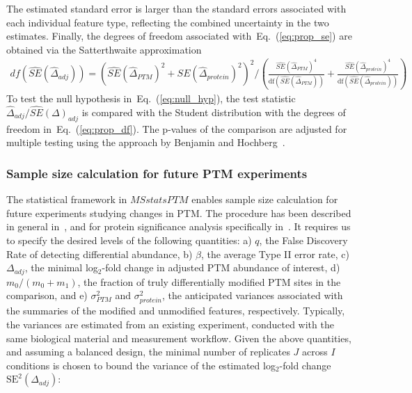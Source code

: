 \documentclass[mcp]{article}
\numberwithin{table}{section}
\def\eqref#1{Eq.~(\ref{eq:#1})}
\begin{document}
The estimated standard error is larger than the standard errors associated with each individual feature type, reflecting the combined uncertainty in the two estimates. 
Finally, the degrees of freedom associated with~\eqref{prop_se} are obtained via the Satterthwaite approximation~\cite{kutner_etal_04a, satterthwaite:1946}
\begin{eqnarray}
df \left(  \widehat{SE}(\hat{\Delta}_{adj}) \right)=  \left( \widehat{SE}(\hat{\Delta}_{PTM})^{2} + \widehat{SE}(\hat{\Delta}_{protein})^{2} \right)^2 \bigg/
\left( \frac{\widehat{SE}(\hat{\Delta}_{PTM})^{4}}{\mathrm{df}(\widehat{SE}(\hat{\Delta}_{PTM}))} + \frac{\widehat{SE}(\hat{\Delta}_{protein})^{4}}{ \mathrm{df}(\widehat{SE}(\hat{\Delta}_{protein}))} \right)
\label{eq:prop_df}
\end{eqnarray}
To test the null hypothesis in~\eqref{null_hyp}, the test statistic $\hat{\Delta}_{adj}/\widehat{SE}(\Delta)_{adj}$ is compared with the Student distribution with the degrees of freedom in~\eqref{prop_df}. The p-values of the comparison are adjusted for multiple testing using the approach by Benjamin and Hochberg~\cite{Benjamini:1995}.

\subsubsection*{Sample size calculation for future PTM experiments}
\label{sec:design}

The statistical framework in $MSstatsPTM$ enables sample size calculation for future experiments studying changes in PTM. 
The procedure has been described in general in~\cite{kutner_etal_04a}, and for protein significance analysis specifically in~\cite{oberg_vitek_09a}. 
It requires us to specify the desired levels of the following quantities: a) $q$, the False Discovery Rate of detecting differential abundance, b) $\beta$, the average Type II error rate, c) $\Delta_{adj}$, the minimal log$_2$-fold change in adjusted PTM abundance  of interest, d) $m_0 / (m_0 + m_1)$, the fraction of truly differentially modified PTM sites in the comparison, and e) $\sigma_{PTM}^{2}$ and $\sigma_{protein}^{2}$, the anticipated variances associated with the summaries of the modified and unmodified features, respectively. Typically, the variances are estimated from an existing experiment, conducted with the same biological material and measurement workflow. Given the above quantities, and assuming a balanced design, the minimal number of replicates $J$ across $I$ conditions is chosen to bound the variance of the estimated log$_2$-fold change $\mathrm{SE}^{2}(\Delta_{adj})$:
\end{document}
